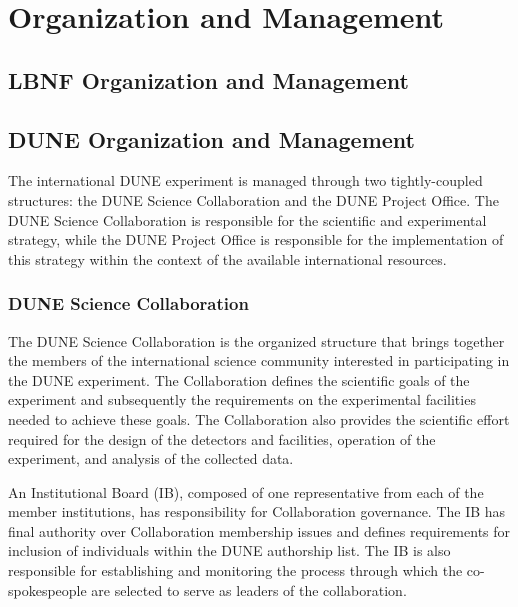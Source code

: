 
\chapter{Organization and Management}
\label{v1ch:org-mgmt}


\section{LBNF Organization and Management}

\section{DUNE Organization and Management}

The international DUNE experiment is managed through two tightly-coupled structures: the DUNE Science Collaboration and the DUNE Project Office.  The DUNE Science Collaboration is responsible for the scientific and experimental strategy, while the DUNE Project Office %
is responsible for the implementation of this strategy within the context of the available international resources.

\subsection{DUNE Science Collaboration}

The DUNE Science Collaboration is the organized structure that brings together the members of the international science community interested in participating in the DUNE experiment.  The Collaboration defines the scientific goals of the experiment and subsequently the requirements on the experimental facilities needed to achieve these goals.  The Collaboration also provides the scientific effort required for the design of the detectors and facilities, operation of the experiment, and analysis of the collected data.  

An Institutional Board (IB), composed of one representative from each of the member institutions, has responsibility for Collaboration governance.  The IB has final authority over Collaboration membership issues and defines requirements for inclusion of individuals within the DUNE authorship list. The IB is also responsible for establishing and monitoring the process through which the co-spokespeople are selected to serve as leaders of the collaboration.   


